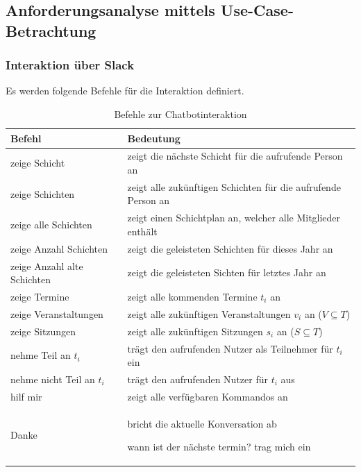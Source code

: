 \subsection{Anforderungsanalyse mittels Use-Case-Betrachtung}

\subsubsection{Interaktion über Slack}

Es werden folgende Befehle für die Interaktion definiert.

\begin{table}[H]
\centering
\begin{tabular}{l|l}
  Befehl & Bedeutung \\
 \hline
 zeige Schicht & zeigt die nächste Schicht für die aufrufende Person an \\
 zeige Schichten & zeigt alle zukünftigen Schichten für die aufrufende Person an \\
 zeige alle Schichten & zeigt einen Schichtplan an, welcher alle Mitglieder enthält \\
 
 zeige Anzahl Schichten & zeigt die geleisteten Schichten für dieses Jahr an \\
 zeige Anzahl alte Schichten & zeigt die geleisteten Sichten für letztes Jahr an \\
 
 zeige Termine & zeigt alle kommenden Termine $t_i$ an \\
 zeige Veranstaltungen & zeigt alle zukünftigen Veranstaltungen $v_i$ an ($V \subseteq T$) \\
 zeige Sitzungen & zeigt alle zukünftigen Sitzungen $s_i$ an ($S \subseteq T$) \\
 
 nehme Teil an $t_i$ & trägt den aufrufenden Nutzer als Teilnehmer für $t_i$ ein \\
 nehme nicht Teil an $t_i$ & trägt den aufrufenden Nutzer für $t_i$ aus\\

 hilf mir & zeigt alle verfügbaren Kommandos an \\
 Danke & bricht die aktuelle Konversation ab
 
 wann ist der nächste termin?
 trag mich ein
 
 
\end{tabular}
\caption{Befehle zur Chatbotinteraktion}
\label{tab:chatbotinteraktion}
\end{table}

